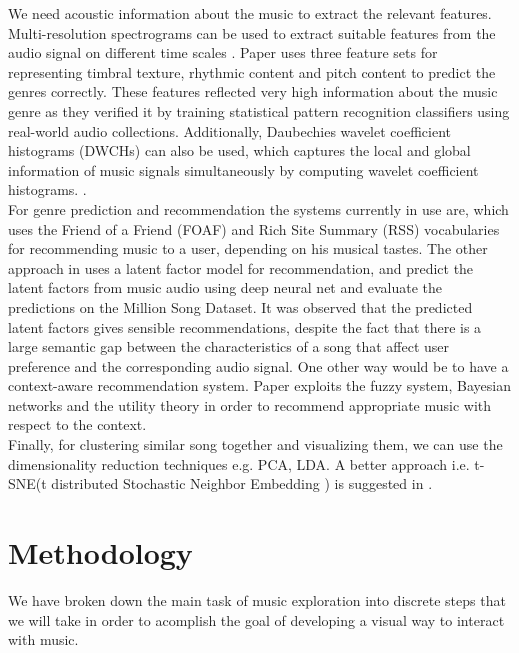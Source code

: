 \documentclass[10pt,twocolumn,letterpaper]{article}
\begin{document}
We need acoustic information about the music to extract the relevant features. Multi-resolution spectrograms can be used to extract suitable features from the audio signal on different time scales \cite{dieleman2013multiscale}.  Paper \cite{li2003comparative} uses three feature sets for representing timbral texture, rhythmic content and pitch content to predict the genres correctly. These features reflected very high information about the music genre as they verified it by training statistical pattern recognition classifiers using real-world audio collections. Additionally, Daubechies wavelet coefficient histograms (DWCHs) \cite{li2003comparative} can also be used, which captures the local and global information of music signals simultaneously by computing wavelet coefficient histograms. . \\

For genre prediction and recommendation the systems currently in use are, \cite{celma2005foafing} which uses the Friend of a Friend (FOAF) and Rich Site Summary (RSS) vocabularies for recommending music to a user, depending on his musical tastes. The other approach in \cite{van2013deep} uses a latent factor model for recommendation, and predict the latent factors from music audio using deep neural net and evaluate the predictions on the Million Song Dataset\cite{bertin2011million}. It was observed that the predicted latent factors gives sensible recommendations, despite the fact that there is a large semantic gap between the characteristics of a song that affect user preference and the corresponding audio signal. One other way would be to have a context-aware recommendation system. Paper \cite{park2006context} exploits the fuzzy system, Bayesian networks and the utility theory in order to recommend appropriate music with respect to the context. \\

Finally, for clustering similar song together and visualizing them, we can use the dimensionality reduction techniques e.g. PCA, LDA. A better approach i.e. t-SNE(t distributed Stochastic Neighbor Embedding ) is suggested in \cite{maaten2008visualizing}. 


\section{Methodology}

We have broken down the main task of music exploration into discrete steps that we will take in order to acomplish the goal of developing a visual way to interact with music. 
\end{document}

